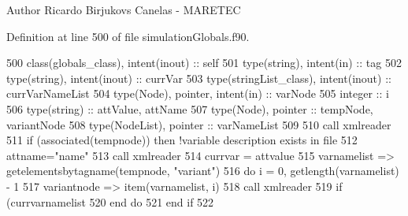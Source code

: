 \begin{DoxyAuthor}{Author}
Ricardo Birjukovs Canelas -\/ M\+A\+R\+E\+T\+EC 
\end{DoxyAuthor}


Definition at line 500 of file simulation\+Globals.\+f90.


\begin{DoxyCode}
500     \textcolor{keywordtype}{class}(globals\_class), \textcolor{keywordtype}{intent(inout)} :: self
501     \textcolor{keywordtype}{type}(string), \textcolor{keywordtype}{intent(in)} :: tag
502     \textcolor{keywordtype}{type}(string), \textcolor{keywordtype}{intent(inout)} :: currVar
503     \textcolor{keywordtype}{type}(stringList\_class), \textcolor{keywordtype}{intent(inout)} :: currVarNameList
504     \textcolor{keywordtype}{type}(Node), \textcolor{keywordtype}{pointer}, \textcolor{keywordtype}{intent(in)} :: varNode
505     \textcolor{keywordtype}{integer} :: i
506     \textcolor{keywordtype}{type}(string) :: attValue, attName
507     \textcolor{keywordtype}{type}(Node), \textcolor{keywordtype}{pointer} :: tempNode, variantNode
508     \textcolor{keywordtype}{type}(NodeList), \textcolor{keywordtype}{pointer} :: varNameList
509 
510     \textcolor{keyword}{call }xmlreader%
511     \textcolor{keywordflow}{if} (\textcolor{keyword}{associated}(tempnode)) \textcolor{keywordflow}{then} \textcolor{comment}{!variable description exists in file}
512         attname=\textcolor{stringliteral}{"name"}
513         \textcolor{keyword}{call }xmlreader%
514         currvar = attvalue
515         varnamelist => getelementsbytagname(tempnode, \textcolor{stringliteral}{"variant"})
516         \textcolor{keywordflow}{do} i = 0, getlength(varnamelist) - 1
517             variantnode => item(varnamelist, i)
518             \textcolor{keyword}{call }xmlreader%
519             \textcolor{keywordflow}{if} (currvarnamelist%
520 \textcolor{keywordflow}{        end do}
521 \textcolor{keywordflow}{    end if}
522 
\end{DoxyCode}
\mbox{\label{namespacesimulationglobals__mod_aa01e0a958ef2e94a02991dcfe390bfa0}} 
